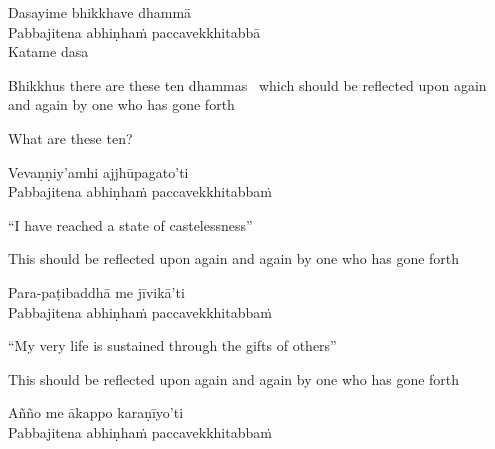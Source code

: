 Dasayime bhikkhave dhammā\\
Pabbajitena abhiṇhaṁ paccavekkhitabbā\\
Katame dasa

\begin{english-hang-verses}
  Bhikkhus there are these ten dhammas\ifdigital\makeatletter\hyperlink{endnote99-appendix}\makeatother\fi
 \breathmark\ which should be reflected upon again and again by one who has gone forth\\
\end{english-hang-verses}

\begin{english}
  What are these ten?
\end{english}

Vevaṇṇiy'amhi ajjhūpagato'ti\\
Pabbajitena abhiṇhaṁ paccavekkhitabbaṁ

\begin{english-verses}
  ``I have reached a state of castelessness''\ifdigital\makeatletter\hyperlink{endnote100-appendix}\makeatother\fi
  \begin{english-hang-together-verses}
    This should be reflected upon again and again by one who has gone forth
  \end{english-hang-together-verses}
\end{english-verses}

\ifninebythirteen\clearpage\fi

Para-paṭibaddhā me jīvikā'ti\\
Pabbajitena abhiṇhaṁ paccavekkhitabbaṁ

\begin{english-verses}
  ``My very life is sustained through the gifts of others''
  \begin{english-hang-together-verses}
    This should be reflected upon again and again by one who has gone forth
  \end{english-hang-together-verses}
\end{english-verses}

\ifbfive\clearpage\fi

Añño me ākappo karaṇīyo'ti\\
Pabbajitena abhiṇhaṁ paccavekkhitabbaṁ

